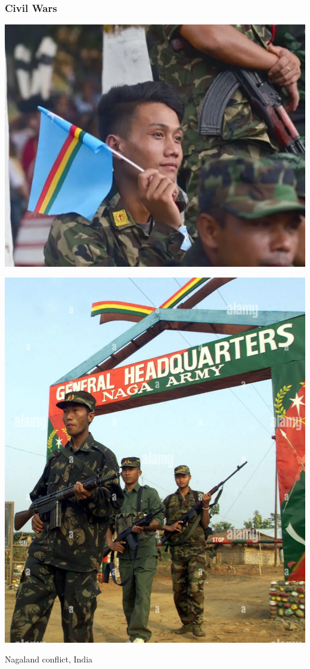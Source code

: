 \documentclass[aspectratio=43]{beamer}
\begin{document}
\begin{frame}
\frametitle{Civil Wars}
\centering

\begin{minipage}{0.49\textwidth}\centering
\includegraphics[width = \textwidth]{img/naga1}
\end{minipage}\hfill
\begin{minipage}{0.49\textwidth}\centering
\includegraphics[width = \textwidth]{img/naga2}
\end{minipage}

Nagaland conflict, India

\end{frame}
\end{document}

